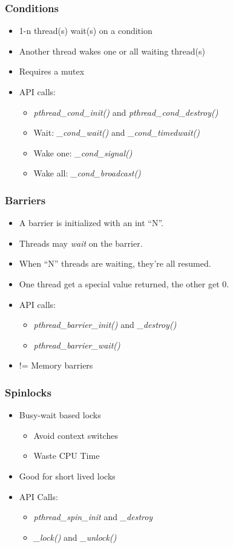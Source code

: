 \begin{frame}
  \frametitle{Conditions}

  \begin{itemize}
  \item 1-n thread(s) wait(s) on a condition
  \item Another thread wakes one or all waiting thread(s)
  \item Requires a mutex
  \item API calls:
    \begin{itemize}
    \item \emph{pthread\_cond\_init()} and \emph{pthread\_cond\_destroy()}
    \item Wait: \emph{\_cond\_wait()} and \emph{\_cond\_timedwait()}
    \item Wake one: \emph{\_cond\_signal()}
    \item Wake all: \emph{\_cond\_broadcast()}
    \end{itemize}
  \end{itemize}
\end{frame}


\begin{frame}
  \frametitle{Barriers}

  \begin{itemize}
  \item A barrier is initialized with an int ``N''.
  \item Threads may \emph{wait} on the barrier.
  \item When ``N'' threads are waiting, they're all resumed.
  \item One thread get a special value returned, the other get 0.
  \item API calls:
    \begin{itemize}
    \item \emph{pthread\_barrier\_init()} and \emph{\_destroy()}
    \item \emph{pthread\_barrier\_wait()}
    \end{itemize}
  \item != Memory barriers
  \end{itemize}
\end{frame}


\begin{frame}
  \frametitle{Spinlocks}

  \begin{itemize}
  \item Busy-wait based locks
    \begin{itemize}
    \item Avoid context switches
    \item Waste CPU Time
    \end{itemize}
  \item Good for short lived locks
  \item API Calls:
    \begin{itemize}
    \item \emph{pthread\_spin\_init} and \emph{\_destroy}
    \item \emph{\_lock()} and \emph{\_unlock()}
    \end{itemize}
  \end{itemize}
\end{frame}


